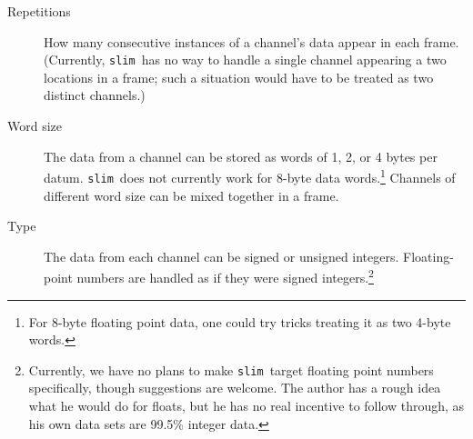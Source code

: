 \documentclass[11pt]{article}
\newcommand{\slim}{{\tt slim}}
\begin{document}
\begin{description}
\item[Repetitions] How many consecutive instances of a channel's data
  appear in each frame.  (Currently, \slim\ has no way to handle a
  single channel appearing a two locations in a frame; such a
  situation would have to be treated as two distinct channels.)

\item[Word size] The data from a channel can be stored as words of 1,
  2, or 4 bytes per datum.  \slim\ does not currently work for 8-byte
  data words.\footnote{For 8-byte floating point data, one could try
  tricks treating it as two 4-byte words.}  Channels of different word
  size can be mixed together in a frame.

\item[Type] The data from each channel can be signed or unsigned
  integers.  Floating-point numbers are handled as if they were signed
  integers.\footnote{Currently, we have no plans to make \slim\ target
  floating point numbers specifically, though suggestions are
  welcome.  The author has a rough idea what he would do for floats,
  but he has no real incentive to follow through, as his own data sets
  are 99.5\% integer data.}

\end{description}
\end{document}
